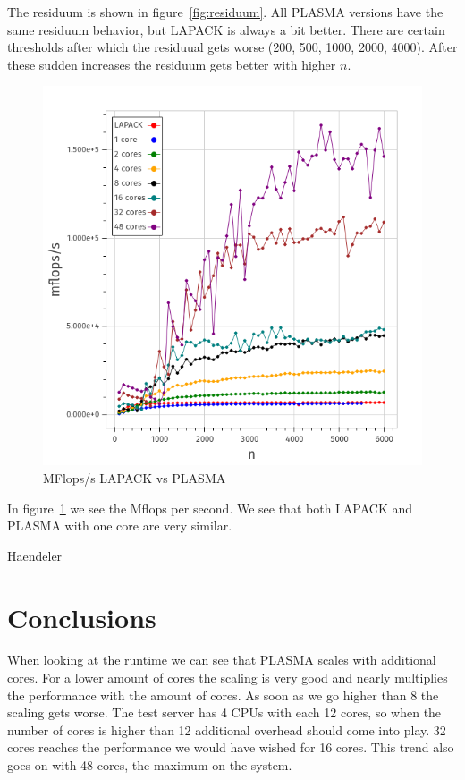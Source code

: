 \documentclass[a4paper,final,ngerman,english]{article}
\begin{document}
The residuum is shown in figure~\ref{fig:residuum}.
All PLASMA versions have the same residuum behavior, but LAPACK is always a bit better.  
There are certain thresholds after which the residuual gets worse (200, 500, 1000, 2000, 4000).
After these sudden increases the residuum gets better with higher $n$.

\begin{figure}[h!]
	\centering
	\includegraphics[width=\textwidth]{mflops}
	\caption{MFlops/s LAPACK vs PLASMA} 
\label{fig:mflops}
\end{figure}

In figure~\ref{fig:mflops} we see the Mflops per second.
We see that both LAPACK and PLASMA with one core are very similar.
\begin{flushright} Haendeler \end{flushright} 

\section{Conclusions}
When looking at the runtime we can see that PLASMA scales with additional cores. 
For a lower amount of cores the scaling is very good and nearly multiplies the performance with the amount of cores.
As soon as we go higher than 8 the scaling gets worse.
The test server has 4 CPUs with each 12 cores, so when the number of cores is higher than 12 additional
overhead should come into play.
32 cores reaches the performance we would have wished for 16 cores.
This trend also goes on with 48 cores, the maximum on the system. 
\end{document}
